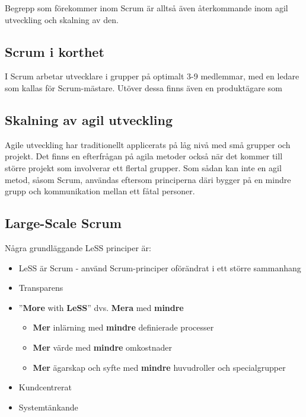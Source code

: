 		Begrepp som förekommer inom Scrum är alltså även återkommande inom agil utveckling och skalning av den.
		
	\subsection{Scrum i korthet}
	
		I Scrum arbetar utvecklare i grupper på optimalt 3-9 medlemmar, med en ledare som kallas för Scrum-mästare. 
		Utöver dessa finns även en produktägare som 
		
		\cite{scrum_guide}
	
		
	
	\subsection{Skalning av agil utveckling}
		
		Agile utveckling har traditionellt applicerats på låg nivå med små grupper och projekt. Det finns en efterfrågan på agila metoder också när det kommer till större projekt som involverar ett flertal grupper. Som sådan kan inte en agil metod, såsom Scrum, användas eftersom principerna däri bygger på en mindre grupp och kommunikation mellan ett fåtal personer.
	
	\subsection{Large-Scale Scrum}
	
		
	
		Några grundläggande LeSS principer är: \cite{less_principles}
		
		\begin{itemize}
			\setlength{\itemsep}{1pt}
			\item LeSS är Scrum - använd Scrum-principer oförändrat i ett större sammanhang			
			\item Transparens
			\item ''\textbf{More} with \textbf{LeSS}'' dvs. \textbf{Mera} med \textbf{mindre}
				\begin{itemize}
					\item \textbf{Mer} inlärning med \textbf{mindre} definierade processer
					\item \textbf{Mer} värde med \textbf{mindre} omkostnader
					\item \textbf{Mer} ägarskap och syfte med \textbf{mindre} huvudroller och specialgrupper
				\end{itemize}
			\item Kundcentrerat
			\item Systemtänkande
		\end{itemize}
		
